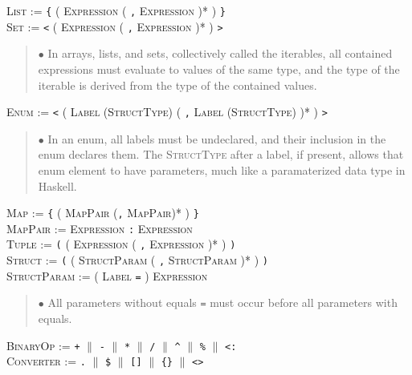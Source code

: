\documentclass{article}
\newcommand{\code}[1]{\colorbox{light-gray}{\texttt{#1}}}
\begin{document}
\textsc{List} := \code{\{} ( \textsc{Expression} ( \code{,} \textsc{Expression} )* ) \code{\}} \\

\textsc{Set} := \code{<} ( \textsc{Expression} ( \code{,} \textsc{Expression} )* ) \code{>}

\begin{quote} $\bullet$ In arrays, lists, and sets, collectively called the iterables, all contained expressions must evaluate to values of the same type, and the type of the iterable is derived from the type of the contained values. \end{quote}

\textsc{Enum} := \code{<} ( \textsc{Label} (\textsc{StructType}) ( \code{,} \textsc{Label} (\textsc{StructType}) )* ) \code{>}

\begin{quote} $\bullet$ In an enum, all labels must be undeclared, and their inclusion in the enum declares them. The \textsc{StructType} after a label, if present, allows that enum element to have parameters, much like a paramaterized data type in Haskell. \end{quote}

\textsc{Map} := \code{\{} ( \textsc{MapPair} (\code{,} \textsc{MapPair})* ) \code{\}} \\

\textsc{MapPair} := \textsc{Expression} \code{:} \textsc{Expression} \\

\textsc{Tuple} := \code{(} ( \textsc{Expression} ( \code{,} \textsc{Expression} )* ) \code{)} \\

\textsc{Struct} := \code{(} ( \textsc{StructParam} ( \code{,} \textsc{StructParam} )* ) \code{)} \\

\textsc{StructParam} := ( \textsc{Label} \code{=} ) \textsc{Expression}

\begin{quote} $\bullet$ All parameters without equals \code{=} must occur before all parameters with equals. \end{quote}

\textsc{BinaryOp} := \code{+} $\|$ \code{-} $\|$ \code{*} $\|$ \code{/} $\|$ \code{\^} $\|$ \code{\%} $\|$ \code{<:} \\

\textsc{Converter} := \code{.} $\|$ \code{\$} $\|$ \code{[]} $\|$ \code{\{\}} $\|$ \code{<>} \\
\end{document}
